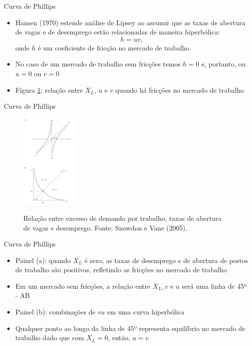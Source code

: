 \documentclass[10pt]{beamer}
\begin{document}
\begin{frame}{Curva de Phillips}
    \begin{itemize}
        \item Hansen (1970) estende análise de Lipsey ao assumir que as taxas de abertura de vagas e de desemprego estão relacionadas de maneira hiperbólica:
        \[
        h = uv,
        \]
        onde $h$ é um coeficiente de fricção no mercado de trabalho.
        \bigskip
        \item No caso de um mercado de trabalho sem fricções temos $h = 0$ e, portanto, ou $u = 0$ ou $v = 0$
        \bigskip
        \item Figura \ref{fig13}: relação entre $X_L$, $u$ e $v$ quando há fricções no mercado de trabalho
    \end{itemize}
\end{frame}

\begin{frame}{Curva de Phillips}
    \begin{figure}
        \centering
        \href{https://raw.githubusercontent.com/pvfonseca/pec/main/notas/figures/aula8_fig5.PNG}{\includegraphics[width=0.25\textwidth]{./figures/aula8_fig5.PNG}}
        \caption{Relação entre excesso de demanda por trabalho, taxas de abertura de vagas e desemprego. Fonte: Snowdon e Vane (2005).}
        \label{fig13}
    \end{figure}
\end{frame}

\begin{frame}{Curva de Phillips}
    \begin{itemize}
        \item Painel (a): quando $X_L$ é zero, as taxas de desemprego e de abertura de postos de trabalho são positivas, refletindo as fricções no mercado de trabalho
        \bigskip
        \item Em um mercado sem fricções, a relação entre $X_L, v$ e $u$ será uma linha de 45º - AB
        \bigskip
        \item Painel (b): combinações de $vu$ em uma curva hiperbólica
        \bigskip
        \item Qualquer ponto ao longo da linha de 45º representa equilíbrio no mercado de trabalho dado que com $X_L = 0$, então, $u = v$
    \end{itemize}
\end{frame}
\end{document}
